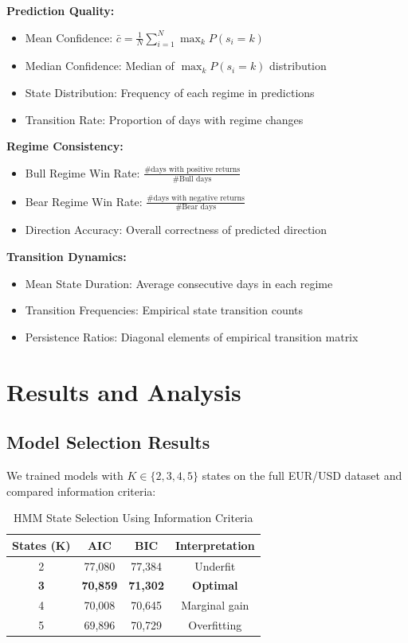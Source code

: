 \documentclass[conference]{IEEEtran}
\begin{document}
\textbf{Prediction Quality:}
\begin{itemize}
\item Mean Confidence: $\bar{c} = \frac{1}{N}\sum_{i=1}^{N}\max_k P(s_i=k)$
\item Median Confidence: Median of $\max_k P(s_i=k)$ distribution
\item State Distribution: Frequency of each regime in predictions
\item Transition Rate: Proportion of days with regime changes
\end{itemize}

\textbf{Regime Consistency:}
\begin{itemize}
\item Bull Regime Win Rate: $\frac{\text{\# days with positive returns}}{\text{\# Bull days}}$
\item Bear Regime Win Rate: $\frac{\text{\# days with negative returns}}{\text{\# Bear days}}$
\item Direction Accuracy: Overall correctness of predicted direction
\end{itemize}

\textbf{Transition Dynamics:}
\begin{itemize}
\item Mean State Duration: Average consecutive days in each regime
\item Transition Frequencies: Empirical state transition counts
\item Persistence Ratios: Diagonal elements of empirical transition matrix
\end{itemize}

\section{Results and Analysis}

\subsection{Model Selection Results}

We trained models with $K \in \{2, 3, 4, 5\}$ states on the full EUR/USD dataset and compared information criteria:

\begin{table}[htbp]
\centering
\caption{HMM State Selection Using Information Criteria}
\label{tab:model_selection}
\begin{tabular}{cccc}
\toprule
\textbf{States (K)} & \textbf{AIC} & \textbf{BIC} & \textbf{Interpretation} \\
\midrule
2 & 77,080 & 77,384 & Underfit \\
\textbf{3} & \textbf{70,859} & \textbf{71,302} & \textbf{Optimal} \\
4 & 70,008 & 70,645 & Marginal gain \\
5 & 69,896 & 70,729 & Overfitting \\
\bottomrule
\end{tabular}
\end{table}
\end{document}
